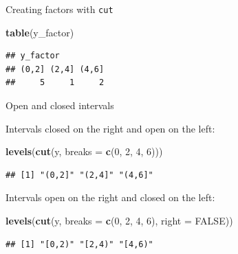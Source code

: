 \documentclass[ignorenonframetext,]{beamer}
\newenvironment{Shaded}{\begin{snugshade}}{\end{snugshade}}
\newcommand{\DataTypeTok}[1]{\textcolor[rgb]{0.13,0.29,0.53}{#1}}
\newcommand{\DecValTok}[1]{\textcolor[rgb]{0.00,0.00,0.81}{#1}}
\newcommand{\KeywordTok}[1]{\textcolor[rgb]{0.13,0.29,0.53}{\textbf{#1}}}
\newcommand{\NormalTok}[1]{#1}
\newcommand{\OtherTok}[1]{\textcolor[rgb]{0.56,0.35,0.01}{#1}}
\begin{document}
\begin{frame}[fragile]{Creating factors with \texttt{cut}}
\protect\hypertarget{creating-factors-with-cut-2}{}

\begin{Shaded}
\begin{Highlighting}[]
\KeywordTok{table}\NormalTok{(y_factor)}
\end{Highlighting}
\end{Shaded}

\begin{verbatim}
## y_factor
## (0,2] (2,4] (4,6] 
##     5     1     2
\end{verbatim}

\end{frame}

\begin{frame}[fragile]{Open and closed intervals}
\protect\hypertarget{open-and-closed-intervals}{}

Intervals closed on the right and open on the left:

\begin{Shaded}
\begin{Highlighting}[]
\KeywordTok{levels}\NormalTok{(}\KeywordTok{cut}\NormalTok{(y, }\DataTypeTok{breaks =} \KeywordTok{c}\NormalTok{(}\DecValTok{0}\NormalTok{, }\DecValTok{2}\NormalTok{, }\DecValTok{4}\NormalTok{, }\DecValTok{6}\NormalTok{))) }
\end{Highlighting}
\end{Shaded}

\begin{verbatim}
## [1] "(0,2]" "(2,4]" "(4,6]"
\end{verbatim}

Intervals open on the right and closed on the left:

\begin{Shaded}
\begin{Highlighting}[]
\KeywordTok{levels}\NormalTok{(}\KeywordTok{cut}\NormalTok{(y, }\DataTypeTok{breaks =} \KeywordTok{c}\NormalTok{(}\DecValTok{0}\NormalTok{, }\DecValTok{2}\NormalTok{, }\DecValTok{4}\NormalTok{, }\DecValTok{6}\NormalTok{), }\DataTypeTok{right =} \OtherTok{FALSE}\NormalTok{)) }
\end{Highlighting}
\end{Shaded}

\begin{verbatim}
## [1] "[0,2)" "[2,4)" "[4,6)"
\end{verbatim}

\end{frame}
\end{document}
